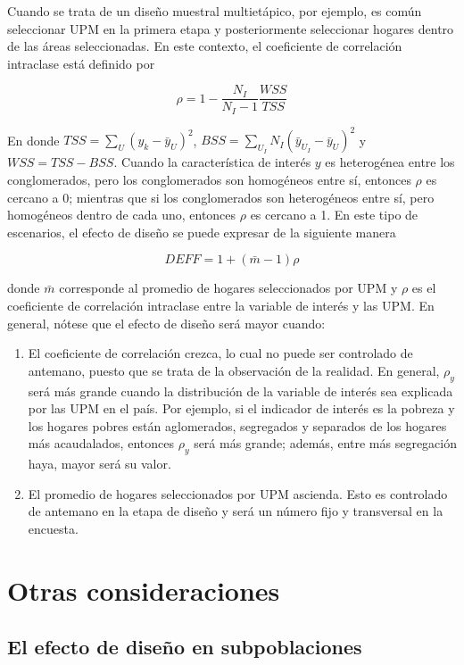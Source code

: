 \documentclass[
  10pt,
  spanish,
]{book}
\providecommand{\tightlist}{%
  \setlength{\itemsep}{0pt}\setlength{\parskip}{0pt}}
\begin{document}
Cuando se trata de un diseño muestral multietápico, por ejemplo, es común seleccionar UPM en la primera etapa y posteriormente seleccionar hogares dentro de las áreas seleccionadas. En este contexto, el coeficiente de correlación intraclase está definido por

\[
\rho=1-\frac{N_I}{N_I-1}\frac{WSS}{TSS}
\]

En donde \(TSS=\sum_{U}{(y_k-{\bar{y}}_U)}^2\), \(BSS=\sum_{U_I} N_I{({\bar{y}}_{U_I}-{\bar{y}}_U)}^2\) y \(WSS=TSS-BSS\). Cuando la característica de interés \(y\) es heterogénea entre los conglomerados, pero los conglomerados son homogéneos entre sí, entonces \(\rho\) es cercano a 0; mientras que si los conglomerados son heterogéneos entre sí, pero homogéneos dentro de cada uno, entonces \(\rho\) es cercano a 1. En este tipo de escenarios, el efecto de diseño se puede expresar de la siguiente manera

\[
DEFF = 1 + (\bar m-1)\rho
\]

donde \(\bar m\) corresponde al promedio de hogares seleccionados por UPM y \(\rho\) es el coeficiente de correlación intraclase entre la variable de interés y las UPM. En general, nótese que el efecto de diseño será mayor cuando:

\begin{enumerate}
\def\labelenumi{\arabic{enumi}.}
\tightlist
\item
  El coeficiente de correlación crezca, lo cual no puede ser controlado de antemano, puesto que se trata de la observación de la realidad. En general, \(\rho_y\) será más grande cuando la distribución de la variable de interés sea explicada por las UPM en el país. Por ejemplo, si el indicador de interés es la pobreza y los hogares pobres están aglomerados, segregados y separados de los hogares más acaudalados, entonces \(\rho_y\) será más grande; además, entre más segregación haya, mayor será su valor.
\item
  El promedio de hogares seleccionados por UPM ascienda. Esto es controlado de antemano en la etapa de diseño y será un número fijo y transversal en la encuesta.
\end{enumerate}

\hypertarget{otras-consideraciones-1}{%
\section{Otras consideraciones}\label{otras-consideraciones-1}}

\hypertarget{el-efecto-de-diseuxf1o-en-subpoblaciones}{%
\subsection{El efecto de diseño en subpoblaciones}\label{el-efecto-de-diseuxf1o-en-subpoblaciones}}
\end{document}
